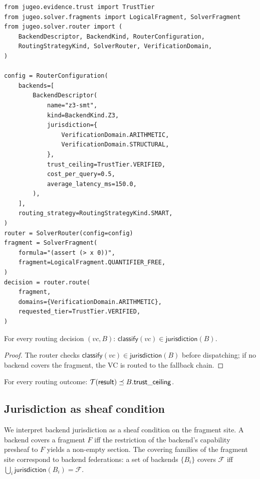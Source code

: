 \documentclass[11pt]{article}
\begin{document}
\begin{lstlisting}[caption={SolverRouter with five strategies.},
                   label=lst:router]
from jugeo.evidence.trust import TrustTier
from jugeo.solver.fragments import LogicalFragment, SolverFragment
from jugeo.solver.router import (
    BackendDescriptor, BackendKind, RouterConfiguration,
    RoutingStrategyKind, SolverRouter, VerificationDomain,
)

config = RouterConfiguration(
    backends=[
        BackendDescriptor(
            name="z3-smt",
            kind=BackendKind.Z3,
            jurisdiction={
                VerificationDomain.ARITHMETIC,
                VerificationDomain.STRUCTURAL,
            },
            trust_ceiling=TrustTier.VERIFIED,
            cost_per_query=0.5,
            average_latency_ms=150.0,
        ),
    ],
    routing_strategy=RoutingStrategyKind.SMART,
)
router = SolverRouter(config=config)
fragment = SolverFragment(
    formula="(assert (> x 0))",
    fragment=LogicalFragment.QUANTIFIER_FREE,
)
decision = router.route(
    fragment,
    domains={VerificationDomain.ARITHMETIC},
    requested_tier=TrustTier.VERIFIED,
)
\end{lstlisting}

\begin{theorem}\label{thm:routing-sound}
For every routing decision $(vc, B)$:
$\mathsf{classify}(vc) \in \mathsf{jurisdiction}(B)$.
\end{theorem}

\begin{proof}
The router checks $\mathsf{classify}(vc) \in
\mathsf{jurisdiction}(B)$ before dispatching; if no backend
covers the fragment, the VC is routed to the fallback chain.
\end{proof}

\begin{theorem}\label{thm:trust-ceiling}
For every routing outcome: $\mathcal{T}(\mathsf{result}) \preceq
B.\mathsf{trust\_ceiling}$.
\end{theorem}

\subsection{Jurisdiction as sheaf condition}

We interpret backend jurisdiction as a sheaf condition on the
fragment site.  A backend covers a fragment $F$ iff the
restriction of the backend's capability presheaf to $F$
yields a non-empty section.  The covering families of the
fragment site correspond to backend federations: a set of
backends $\{B_i\}$ covers $\mathcal{F}$ iff
$\bigcup_i \mathsf{jurisdiction}(B_i) = \mathcal{F}$.
\end{document}
